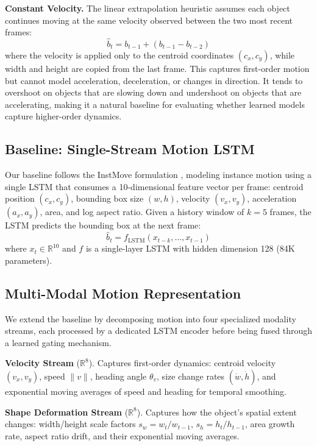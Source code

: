 \documentclass{article}
\begin{document}
\textbf{Constant Velocity.} The linear extrapolation heuristic assumes each object continues moving at the same velocity observed between the two most recent frames:
\[
\hat{b}_t = b_{t-1} + (b_{t-1} - b_{t-2})
\]
where the velocity is applied only to the centroid coordinates $(c_x, c_y)$, while width and height are copied from the last frame. This captures first-order motion but cannot model acceleration, deceleration, or changes in direction. It tends to overshoot on objects that are slowing down and undershoot on objects that are accelerating, making it a natural baseline for evaluating whether learned models capture higher-order dynamics.

\subsection{Baseline: Single-Stream Motion LSTM}

Our baseline follows the InstMove formulation \cite{liu2023instmove}, modeling instance motion using a single LSTM that consumes a 10-dimensional feature vector per frame: centroid position $(c_x, c_y)$, bounding box size $(w, h)$, velocity $(v_x, v_y)$, acceleration $(a_x, a_y)$, area, and log aspect ratio. Given a history window of $k=5$ frames, the LSTM predicts the bounding box at the next frame:
\[
\hat{b}_t = f_{\text{LSTM}}(x_{t-k}, \ldots, x_{t-1})
\]
where $x_t \in \mathbb{R}^{10}$ and $f$ is a single-layer LSTM with hidden dimension 128 (84K parameters).

\subsection{Multi-Modal Motion Representation}

We extend the baseline by decomposing motion into four specialized modality streams, each processed by a dedicated LSTM encoder before being fused through a learned gating mechanism.

\textbf{Velocity Stream} ($\mathbb{R}^{8}$). Captures first-order dynamics: centroid velocity $(v_x, v_y)$, speed $\|v\|$, heading angle $\theta_v$, size change rates $(\dot{w}, \dot{h})$, and exponential moving averages of speed and heading for temporal smoothing.

\textbf{Shape Deformation Stream} ($\mathbb{R}^{8}$). Captures how the object's spatial extent changes: width/height scale factors $s_w = w_t / w_{t-1}$, $s_h = h_t / h_{t-1}$, area growth rate, aspect ratio drift, and their exponential moving averages.
\end{document}
